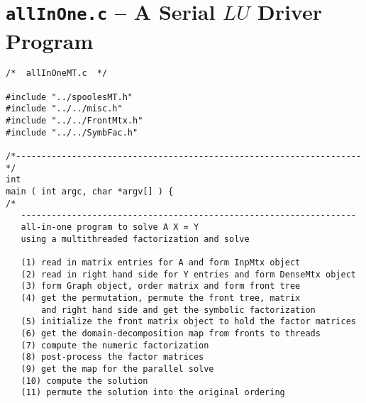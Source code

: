 \vfill \eject
\section{{\tt allInOne.c} -- A Serial $LU$ Driver Program}
\label{section:LU-MT-driver}

\begin{verbatim}
/*  allInOneMT.c  */

#include "../spoolesMT.h"
#include "../../misc.h"
#include "../../FrontMtx.h"
#include "../../SymbFac.h"

/*--------------------------------------------------------------------*/
int
main ( int argc, char *argv[] ) {
/*
   ------------------------------------------------------------------
   all-in-one program to solve A X = Y
   using a multithreaded factorization and solve

   (1) read in matrix entries for A and form InpMtx object
   (2) read in right hand side for Y entries and form DenseMtx object
   (3) form Graph object, order matrix and form front tree
   (4) get the permutation, permute the front tree, matrix 
       and right hand side and get the symbolic factorization
   (5) initialize the front matrix object to hold the factor matrices
   (6) get the domain-decomposition map from fronts to threads
   (7) compute the numeric factorization
   (8) post-process the factor matrices
   (9) get the map for the parallel solve
   (10) compute the solution
   (11) permute the solution into the original ordering


\end{verbatim}
